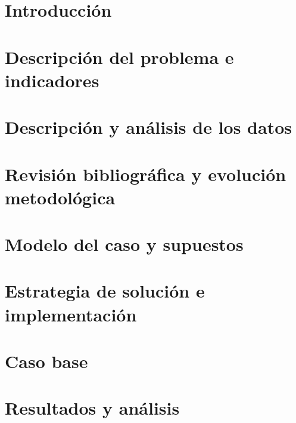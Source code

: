 \documentclass[pdftex,spanish]{pucthesis}	%
\begin{document}

\chapter[INTRODUCCIÓN]{Introducción} \label{ch:introduccion}


\chapter[DESCRIPCIÓN DEL PROBLEMA E INDICADORES]{Descripción del problema e indicadores} \label{ch:problema}


\chapter[DESCRIPCIÓN Y ANÁLISIS DE LOS DATOS]{Descripción y análisis de los datos} \label{ch:datos}


\chapter[REVISIÓN BIBLIOGRÁFICA Y EVOLUCIÓN METODOLÓGICA]{Revisión bibliográfica y evolución metodológica} \label{ch:literatura}


\chapter[MODELO DEL CASO Y SUPUESTOS]{Modelo del caso y supuestos} \label{ch:modelo}


\chapter[ESTRATEGIA DE SOLUCIÓN E IMPLEMENTACIÓN]{Estrategia de solución e implementación} \label{ch:estrategia}


\chapter[CASO BASE]{Caso base} \label{ch:caso-base}


\chapter[RESULTADOS Y ANÁLISIS]{Resultados y análisis} \label{ch:resultados}

\end{document}
